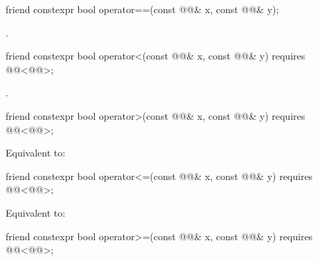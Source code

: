 %
\begin{itemdecl}
friend constexpr bool operator==(const @@& x, const @@& y);
\end{itemdecl}

\begin{itemdescr}
\pnum
\returns
{}.
\end{itemdescr}

%
\begin{itemdecl}
friend constexpr bool operator<(const @@& x, const @@& y)
  requires @@<@@>;
\end{itemdecl}

\begin{itemdescr}
\pnum
\returns
{}.
\end{itemdescr}

%
\begin{itemdecl}
friend constexpr bool operator>(const @@& x, const @@& y)
  requires @@<@@>;
\end{itemdecl}

\begin{itemdescr}
\pnum
\effects
Equivalent to: 
\end{itemdescr}

%
\begin{itemdecl}
friend constexpr bool operator<=(const @@& x, const @@& y)
  requires @@<@@>;
\end{itemdecl}

\begin{itemdescr}
\pnum
\effects
Equivalent to: 
\end{itemdescr}

%
\begin{itemdecl}
friend constexpr bool operator>=(const @@& x, const @@& y)
  requires @@<@@>;
\end{itemdecl}


